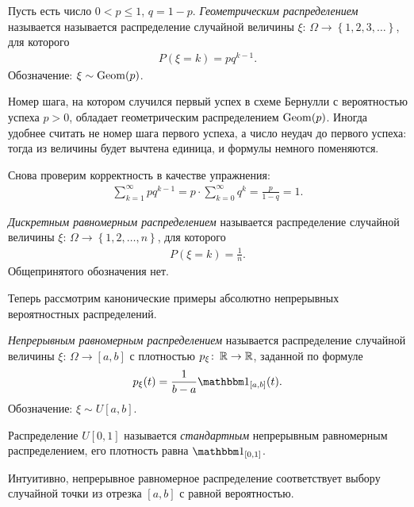 \documentclass[../main.tex]{subfiles}
\begin{document}
\begin{exmpl}
 Пусть есть число $ 0 < p \leqslant 1 $, $ q = 1-p $. \textit{Геометрическим распределением} называется называется распределение случайной величины $ \xi \colon\,\Omega \to \left\{ 1,2,3,\ldots \right\} $, для которого
 \begin{align*}
  P(\xi = k) = pq^{k-1}.
 \end{align*} Обозначение: $ \xi \sim \mathrm{Geom}(p) $.

 Номер шага, на котором случился первый успех в схеме Бернулли с вероятностью успеха $ p > 0$, обладает геометрическим распределением $ \mathrm{Geom}(p) $. Иногда удобнее считать не номер шага первого успеха, а число неудач до первого успеха: тогда из величины будет вычтена единица, и формулы немного поменяются.

 Снова проверим корректность в качестве упражнения:
 \begin{align*}
  \sum_{k=1}^{\infty} pq^{k-1} = p \cdot \sum_{k=0}^{\infty} q^{k} = \frac{p}{1 - q} = 1.
 \end{align*} 
\end{exmpl}

\begin{exmpl}
 \textit{Дискретным равномерным распределением} называется распределение случайной величины $ \xi\colon\,\Omega\to \left\{ 1,2,\ldots,n \right\} $, для которого
 \begin{align*}
  P(\xi = k) = \frac{1}{n}.
 \end{align*} Общепринятого обозначения нет.
\end{exmpl}

Теперь рассмотрим канонические примеры абсолютно непрерывных вероятностных распределений.

\begin{exmpl}
 \textit{Непрерывным равномерным распределением} называется распределение случайной величины $ \xi\colon\,\Omega \to [a,b] $ с плотностью $ p_\xi \colon\,\mathbb{R}\to\mathbb{R} $, заданной по формуле
 \begin{align*}
  p_\xi(t) = \frac{1}{b-a}\Ind_{[a,b]}(t).
 \end{align*} Обозначение: $ \xi \sim U[a,b] $.

 Распределение $ U[0,1] $ называется \textit{стандартным} непрерывным равномерным распределением, его плотность равна $ \Ind_{[0,1]} $.

 Интуитивно, непрерывное равномерное распределение соответствует выбору случайной точки из отрезка $ [a,b] $ с равной вероятностью.
\end{exmpl}
\end{document}
